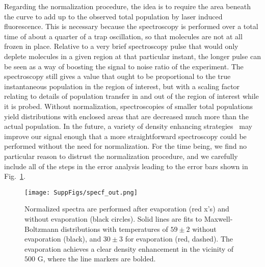 \documentclass[%
 reprint,
 amsmath,amssymb,
 aps,
prl,
]{revtex4-1}
\begin{document}
Regarding the normalization procedure, the idea is to require the area beneath the curve to add up to the observed total population by laser induced fluorescence.
This is necessary because the spectroscopy is performed over a total time of about a quarter of a trap oscillation, so that molecules are not at all frozen in place.
Relative to a very brief spectroscopy pulse that would only deplete molecules in a given region at that particular instant, the longer pulse can be seen as a way of boosting the signal to noise ratio of the experiment.
The spectroscopy still gives a value that ought to be proportional to the true instantaneous population in the region of interest, but with a scaling factor relating to details of population transfer in and out of the region of interest while it is probed.
Without normalization, spectroscopies of smaller total populations yield distributions with enclosed areas that are decreased much more than the actual population.
In the future, a variety of density enhancing strategies~\cite{smt} may improve our signal enough that a more straightforward spectroscopy could be performed without the need for normalization.
For the time being, we find no particular reason to distrust the normalization procedure, and we carefully include all of the steps in the error analysis leading to the error bars shown in Fig.~\ref{fig:normenhance}.


\begin{figure}[tb]
\texttt{[image: SuppFigs/specf\_out.png]}%
\caption{
Normalized spectra are performed after evaporation (red x's) and without evaporation (black circles). Solid lines are fits to Maxwell-Boltzmann distributions with temperatures of $59\pm2$ without evaporation (black), and $30\pm3$ for evaporation (red, dashed). The evaporation achieves a clear density enhancement in the vicinity of $500\text{ G}$, where the line markers are bolded. 
}
\label{fig:normenhance}
\end{figure}
\end{document}
